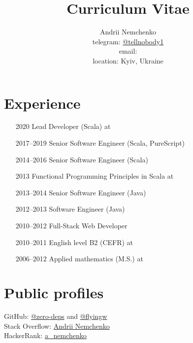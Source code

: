 

\title{Curriculum Vitae}
\author{
  Andrii Nemchenko\\
  telegram: \href{https://t.me/tellnobody1}{@tellnobody1}\\
  email: \\
  location: Kyiv, Ukraine
}
\maketitle

\section{Experience}
\begin{itemize}
  \item[2020] Lead Developer (Scala) at 
  \item[2017–2019] Senior Software Engineer (Scala, PureScript)
  \item[2014–2016] Senior Software Engineer (Scala)
  \item[2013] Functional Programming Principles in Scala at 
  \item[2013–2014] Senior Software Engineer (Java)
  \item[2012–2013] Software Engineer (Java)
  \item[2010–2012] Full-Stack Web Developer
  \item[2010–2011] English level B2 (CEFR) at 
  \item[2006–2012] Applied mathematics (M.S.) at 
\end{itemize}

\section{Public profiles}
GitHub:
\href{https://github.com/zero-deps}{@zero-deps} and
\href{https://github.com/flyingw}{@flyingw} \\
Stack Overflow:
\href{https://stackoverflow.com/users/355491}{Andrii Nemchenko} \\
HackerRank:
\href{https://www.hackerrank.com/a\_nemchenko}{a\_nemchenko}

\pagebreak

